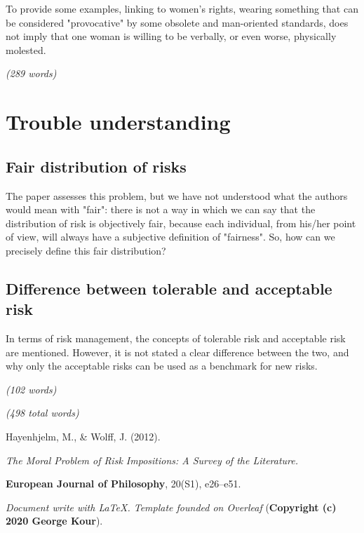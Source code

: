 To provide some examples, linking to women's rights, wearing something that can be considered "provocative" by some obsolete and man-oriented standards, does not imply that one woman is willing to be verbally, or even worse, physically molested.

\emph{(289 words)}

\section{Trouble understanding}
\subsection{Fair distribution of risks}
The paper assesses this problem, but we have not understood what the authors would mean with "fair": there is not a way in which we can say that the distribution of risk is objectively fair, because each individual, from his/her point of view, will always have a subjective definition of "fairness". So, how can we precisely define this fair distribution?

\subsection{Difference between tolerable and acceptable risk}
In terms of risk management, the concepts of tolerable risk and acceptable risk are mentioned. However, it is not stated a clear difference between the two, and why only the acceptable risks can be used as a benchmark for new risks.

\emph{(102 words)}

\emph{(498 total words)}

\newpage
\begin{thebibliography}{99}


Hayenhjelm, M., \& Wolff, J. (2012).

\textit{The Moral Problem of Risk Impositions: A Survey of the Literature.}

\textbf{European Journal of Philosophy}, 20(S1), e26–e51.

\end{thebibliography}

\textit{Document write with \LaTeX. Template founded on Overleaf} (\textbf{Copyright (c) 2020 George Kour}).